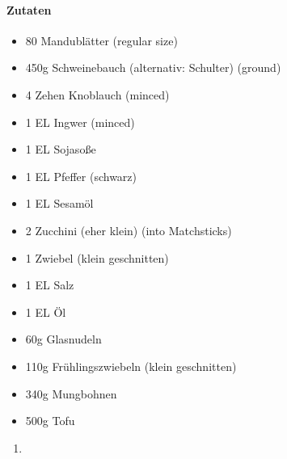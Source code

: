 \newpage
{}
\paragraph{Zutaten}	
\begin{itemize}[noitemsep]
	\item 80 Mandublätter (regular size)
	\item 450g Schweinebauch (alternativ: Schulter) (ground)
	\item 4 Zehen Knoblauch (minced)
	\item 1 EL Ingwer (minced)
	\item 1 EL Sojasoße
	\item 1 EL Pfeffer (schwarz)
	\item 1 EL Sesamöl
	\item 2 Zucchini (eher klein) (into Matchsticks)
	\item 1 Zwiebel (klein geschnitten)
	\item 1 EL Salz
	\item 1 EL Öl
	\item 60g Glasnudeln 
	\item 110g Frühlingszwiebeln (klein geschnitten)
	\item 340g Mungbohnen
	\item 500g Tofu
\end{itemize}
\begin{enumerate}[noitemsep]
	\item 
\end{enumerate}